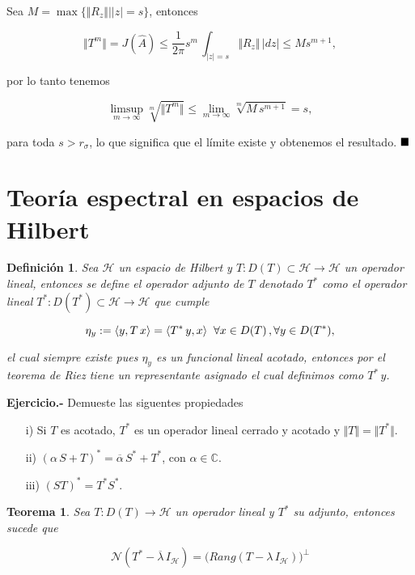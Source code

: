 \documentclass[letterpaper]{report}
\newtheorem{teorema}{Teorema}[chapter]
\newtheorem{def.}{Definici\'on}[chapter]
\newcommand{\co}{\ensuremath{\mathbb C }}
\newcommand{\hil}{\ensuremath{\mathcal H }}
\newcommand{\nuc}{\ensuremath{\mathcal{N}}}
\newcommand{\qed}{\ensuremath{\hspace*{0em plus 1fill}\blacksquare}}
\begin{document}
\begin{dem}
Sea $M=\max\lbrace\Vert R_z\Vert\mid\vert z\vert=s\rbrace$, entonces

$$
\Vert T^m\Vert=J(\widehat{A})\leq
\frac{1}{2\pi}s^m\,\int_{\vert z\vert=s}\Vert R_z \Vert\,\vert dz\vert\leq M s^{m+1},
$$

por lo tanto tenemos

$$
\limsup_{m\rightarrow\infty} \sqrt[m]{\Vert T^m\Vert}\leq\lim_{m\rightarrow\infty} \sqrt[m]{M\,s^{m+1}}=s,
$$

para toda $s>r_{\sigma}$, lo que significa que el límite existe y obtenemos el resultado. \qed
\end{dem}

\section{Teoría espectral en espacios de Hilbert}

\begin{def.}
Sea $\hil$ un espacio de Hilbert y \hbox{$T:D(T)\subset\hil\rightarrow\hil$} un operador lineal, entonces se define el operador adjunto de $T$ denotado $T^*$ como el operador lineal \hbox{$T^*:D(T^*)\subset\hil\rightarrow\hil$} que cumple

\begin{equation}
\eta_y:=\langle y,T\,x\rangle=\langle T^*\,y,x\rangle
\hspace{0.2cm}\forall x\in D(T)\,,\forall y\in D(T^*),
\end{equation}

el cual siempre existe pues $\eta_y$ es un funcional lineal acotado, entonces por el teorema de Riez tiene un representante asignado el cual definimos como $T^*\,y$. 
\end{def.}

\noindent\textbf{Ejercicio.-} Demueste las siguentes propiedades
\begin{enumerate}
\item[i)] Si $T$ es acotado, $T^*$ es un operador lineal cerrado y acotado y $\Vert T\Vert=\Vert T^*\Vert$.
\item[ii)]$(\alpha\,S+T)^*=\overline{\alpha}\,S^*+T^*$, con $\alpha\in\co$.
\item[iii)]$(ST)^*=T^*S^*$.
\end{enumerate}

\begin{teorema}\label{teo1}
Sea $T:D(T)\rightarrow\hil$ un operador lineal y $T^*$ su adjunto, entonces sucede que

\begin{equation}
\nuc(T^*-\overline{\lambda}\,I_{\hil})=
\big(Rang(T-\lambda\,I_{\hil})\big)^{\bot}
\end{equation} 
\end{teorema}
\end{document}
